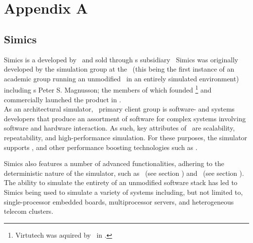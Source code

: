 
\chapter*{Appendix A}
\label{cha:appendixa}

\section*{Simics}
\label{sec:appendixa_simics}
Simics is a  developed by \dvttermintel\ and sold through \dvttermintel s subsidiary \dvttermwindriver\
Simics was originally developed by the simulation group at the \dvttermsics\ (this being the first instance of an academic group running an unmodified \dvttermos\ in an entirely simulated environment) including \dvttermgoogle s Peter S. Magnusson; the members of which founded \dvttermvirtutech \footnote{Virtutech was aquired by \dvttermintel\ in .} and commercially launched the product in .\\

\noindent
As an architectural simulator, \dvttermsimics\ primary client group is software- and systems developers that produce an assortment of software for complex systems involving software and hardware interaction.
As such, key attributes of \dvttermsimics\ are scalability, repeatability, and high-performance simulation.
For these purposes, the simulator supports \dvttermhostvirtualizationextensions , and other performance boosting technologies such as \dvttermhypersimulation {}.

Simics also features a number of advanced functionalities, adhering to the deterministic nature of the simulator, such as \dvttermcheckpointing\ (see section ) and \dvttermreverseexecution\ (see section ).\\

\noindent
The ability to simulate the entirety of an unmodified software stack has led to Simics being used to simulate a variety of systems including, but not limited to, single-processor embedded boards, multiprocessor servers, and heterogeneous telecom clusters.

